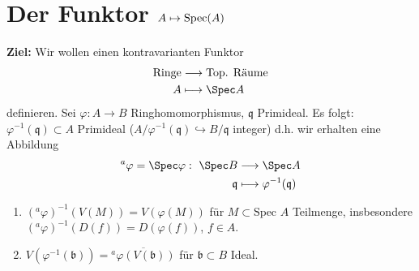 \section{Der Funktor $A\protect\mapsto\text{Spec}(A)$}

\textbf{Ziel:} Wir wollen einen kontravarianten Funktor
\begin{align*}
  \text{Ringe} & \longrightarrow\text{Top. Räume}\\
  A & \longmapsto\Spec A
\end{align*}
definieren. Sei $\varphi:A\longrightarrow B$ Ringhomomorphismus, $\mathfrak{q}$ Primideal. Es folgt:
$\varphi^{-1}(\mathfrak{q})\subset A$ Primideal ($A/\varphi^{-1}(\mathfrak{q})\hookrightarrow B/\mathfrak{q}$ integer)
d.h. wir erhalten eine Abbildung
\begin{align*}
  ^{a}\varphi=\Spec\varphi:\ \Spec B & \longrightarrow\Spec A\\
  \mathfrak{q} & \longmapsto\varphi^{-1}(\mathfrak{q})
\end{align*}

\begin{prop} \mbox{}
  \begin{enumerate}
  \item $(^{a}\varphi)^{-1}(V(M))=V(\varphi(M))$ für
    $M\subset\text{Spec }A$ Teilmenge, insbesondere
    $(^{a}\varphi)^{-1}(D(f))=D(\varphi(f))$, $f\in A$.
  \item
    $V(\varphi^{-1}(\mathfrak{b}))=\overline{^{a}\varphi(V(\mathfrak{b}))}$
    für $\mathfrak{b}\subset B$ Ideal.
  \end{enumerate}
\end{prop}

